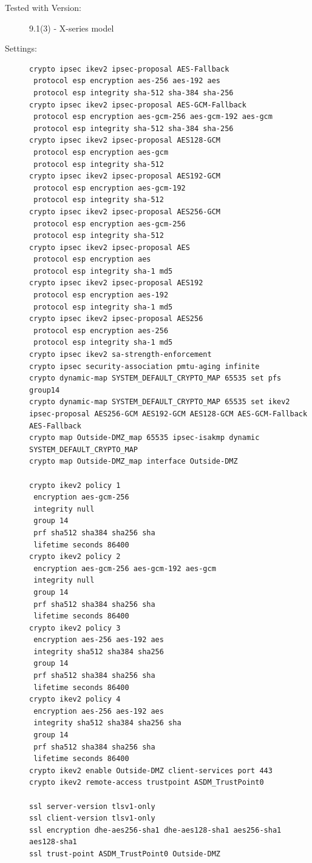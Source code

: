 \begin{description}
\item[Tested with Version:] 
9.1(3) - X-series model
\item[Settings:] \mbox{}
\begin{lstlisting}
crypto ipsec ikev2 ipsec-proposal AES-Fallback
 protocol esp encryption aes-256 aes-192 aes
 protocol esp integrity sha-512 sha-384 sha-256
crypto ipsec ikev2 ipsec-proposal AES-GCM-Fallback
 protocol esp encryption aes-gcm-256 aes-gcm-192 aes-gcm
 protocol esp integrity sha-512 sha-384 sha-256
crypto ipsec ikev2 ipsec-proposal AES128-GCM
 protocol esp encryption aes-gcm
 protocol esp integrity sha-512
crypto ipsec ikev2 ipsec-proposal AES192-GCM
 protocol esp encryption aes-gcm-192
 protocol esp integrity sha-512
crypto ipsec ikev2 ipsec-proposal AES256-GCM
 protocol esp encryption aes-gcm-256
 protocol esp integrity sha-512
crypto ipsec ikev2 ipsec-proposal AES
 protocol esp encryption aes
 protocol esp integrity sha-1 md5
crypto ipsec ikev2 ipsec-proposal AES192
 protocol esp encryption aes-192
 protocol esp integrity sha-1 md5
crypto ipsec ikev2 ipsec-proposal AES256
 protocol esp encryption aes-256
 protocol esp integrity sha-1 md5
crypto ipsec ikev2 sa-strength-enforcement
crypto ipsec security-association pmtu-aging infinite
crypto dynamic-map SYSTEM_DEFAULT_CRYPTO_MAP 65535 set pfs group14
crypto dynamic-map SYSTEM_DEFAULT_CRYPTO_MAP 65535 set ikev2 ipsec-proposal AES256-GCM AES192-GCM AES128-GCM AES-GCM-Fallback AES-Fallback
crypto map Outside-DMZ_map 65535 ipsec-isakmp dynamic SYSTEM_DEFAULT_CRYPTO_MAP
crypto map Outside-DMZ_map interface Outside-DMZ

crypto ikev2 policy 1
 encryption aes-gcm-256
 integrity null
 group 14
 prf sha512 sha384 sha256 sha
 lifetime seconds 86400
crypto ikev2 policy 2
 encryption aes-gcm-256 aes-gcm-192 aes-gcm
 integrity null
 group 14
 prf sha512 sha384 sha256 sha
 lifetime seconds 86400
crypto ikev2 policy 3
 encryption aes-256 aes-192 aes
 integrity sha512 sha384 sha256
 group 14
 prf sha512 sha384 sha256 sha
 lifetime seconds 86400
crypto ikev2 policy 4
 encryption aes-256 aes-192 aes
 integrity sha512 sha384 sha256 sha
 group 14
 prf sha512 sha384 sha256 sha
 lifetime seconds 86400
crypto ikev2 enable Outside-DMZ client-services port 443
crypto ikev2 remote-access trustpoint ASDM_TrustPoint0

ssl server-version tlsv1-only
ssl client-version tlsv1-only
ssl encryption dhe-aes256-sha1 dhe-aes128-sha1 aes256-sha1 aes128-sha1
ssl trust-point ASDM_TrustPoint0 Outside-DMZ
\end{lstlisting}


\end{description}
